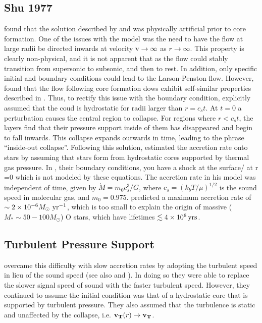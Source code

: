 \documentclass[../dissertation.tex]{subfiles}
\begin{document}
\subsection{Shu 1977} \label{subsec:Shu_review}
\citet{1977ApJ...214..488S} found that the solution described by \citet{1969MNRAS.145..271L} and \citet{1969MNRAS.144..425P} was physically artificial prior to core formation.
One of the issues with the model was the need to have the flow at large radii be directed inwards at velocity ${\rm v} \rightarrow \infty$ as $r \rightarrow \infty$. 
This property is clearly non-physical, and it is not apparent that as the flow could stably transition from supersonic to subsonic, and then to rest. 
In addition, only specific initial and boundary conditions could lead to the Larson-Penston flow.
However, \citet{1977ApJ...214..488S} found that the flow following core formation dows exhibit self-similar properties described in \citet{1969MNRAS.145..271L}.
Thus, to rectify this issue with the boundary condition, \citet{1977ApJ...214..488S} explicitly assumed that the coud is hydrostatic for radii larger than $r = c_s t$. 
At $t=0$ a perturbation causes the central region to collapse. 
For regions where $r < c_s t$, the layers find that their pressure support inside of them has disappeared and begin to fall inwards. 
This collapse expands outwards in time, leading to the phrase ``inside-out collapse''. 
Following this solution, \citet{1977ApJ...214..488S} estimated the accretion rate onto 
stars by assuming that stars form from hydrostatic cores supported by thermal gas pressure. 
In \citet{1977ApJ...214..488S}, their boundary conditions, you have a shock at the surface/ at r =0 which is not modeled by these equations.
The accretion rate in his model was independent of time, given by $\dot{M} = m_0c_s^3/G$, where $c_s = (k_b T / \mu)^{1/2}$  is the sound
speed in molecular gas, and $m_0 = 0.975$. 
\citet{1977ApJ...214..488S} predicted a maximum accretion rate of $\sim 2\times10^{-6} M_\odot\,\,\rm yr^{-1}$, which is too small to explain 
the origin of massive ($M_*\sim50-100M_\odot$) O stars, which have lifetimes $\lesssim 4\times10^6\,\rm yrs$.

\subsection{Turbulent Pressure Support}
\citet{1992ApJ...396..631M} overcame this difficulty with slow accretion rates by adopting 
the turbulent speed in lieu of the sound speed (see also \citet{1997ApJ...476..750M} and
\citet{2003ApJ...585..850M}). 
In doing so they were able to replace the slower signal speed of sound with the faster turbulent speed. 
However, they continued to assume the initial condition was that of a hydrostatic core that is supported by
turbulent pressure. They also assumed that the turbulence is static and unaffected by the collapse, i.e. $\mathbf{v_T} (r) \rightarrow \mathbf{v_T}$.  
\end{document}
